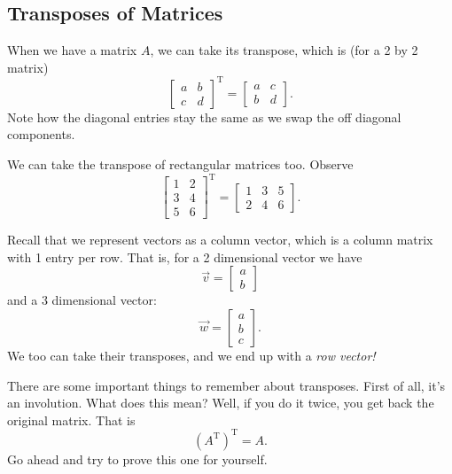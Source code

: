\subsection{Transposes of Matrices}

When we have a matrix $A$, we can take its transpose, which is (for a 2 by 2 matrix)
\begin{equation}
\left[\begin{array}{cc}
a & b\\
c & d
\end{array}\right]^{\mathrm{T}}
= 
\left[\begin{array}{cc}
a & c\\
b & d
\end{array}\right].
\end{equation}
Note how the diagonal entries stay the same as we swap the off diagonal components. 

We can take the transpose of rectangular matrices too. Observe
\begin{equation}
\begin{bmatrix} 1 & 2 \\ 3 & 4 \\ 5 & 6 \end{bmatrix}^{\mathrm{T}}  = \begin{bmatrix} 1 & 3 & 5\\ 2 & 4 & 6 \end{bmatrix}. 
\end{equation}

Recall that we represent vectors as a column vector, which is a column matrix with 1 entry per row. That is, for a 2 dimensional vector we have
\begin{equation}
\vec{v} = \begin{bmatrix}
a \\
b
\end{bmatrix}
\end{equation}
and a 3 dimensional vector:
\begin{equation}
\vec{w} = \begin{bmatrix}
a \\
b \\
c
\end{bmatrix}.
\end{equation}
We too can take their transposes, and we end up with a \emph{row vector!}

There are some important things to remember about transposes. First of all, it's an involution. What does this mean? Well, if you do it twice, you get back the original matrix. That is
\begin{equation}
(A^{\textrm{T}})^{\textrm{T}} = A.
\end{equation}
Go ahead and try to prove this one for yourself.

